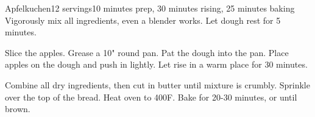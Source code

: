 \documentclass[../Cookbook.tex]{subfiles}
\begin{document}
\begin{recipe}[Apfelkuchen]{Apfelkuchen}{12 servings}{10 minutes prep, 30 minutes rising, 25 minutes baking}
	Vigorously mix all ingredients, even a blender works.
	Let dough rest for 5 minutes.

	Slice the apples.
	Grease a 10" round pan.
	Pat the dough into the pan.
	Place apples on the dough and push in lightly.
	Let rise in a warm place for 30 minutes.

	Combine all dry ingredients, then cut in butter until mixture is crumbly.
	Sprinkle over the top of the bread.
	Heat oven to 400\0F.
	Bake for 20-30 minutes, or until brown.
\end{recipe}
\end{document}
